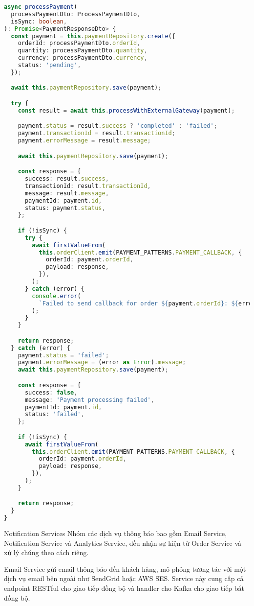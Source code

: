 \begin{lstlisting}[language=Typescript]
async processPayment(
  processPaymentDto: ProcessPaymentDto,
  isSync: boolean,
): Promise<PaymentResponseDto> {
  const payment = this.paymentRepository.create({
    orderId: processPaymentDto.orderId,
    quantity: processPaymentDto.quantity,
    currency: processPaymentDto.currency,
    status: 'pending',
  });

  await this.paymentRepository.save(payment);

  try {
    const result = await this.processWithExternalGateway(payment);

    payment.status = result.success ? 'completed' : 'failed';
    payment.transactionId = result.transactionId;
    payment.errorMessage = result.message;

    await this.paymentRepository.save(payment);

    const response = {
      success: result.success,
      transactionId: result.transactionId,
      message: result.message,
      paymentId: payment.id,
      status: payment.status,
    };

    if (!isSync) {
      try {
        await firstValueFrom(
          this.orderClient.emit(PAYMENT_PATTERNS.PAYMENT_CALLBACK, {
            orderId: payment.orderId,
            payload: response,
          }),
        );
      } catch (error) {
        console.error(
          `Failed to send callback for order ${payment.orderId}: ${error}`,
        );
      }
    }

    return response;
  } catch (error) {
    payment.status = 'failed';
    payment.errorMessage = (error as Error).message;
    await this.paymentRepository.save(payment);

    const response = {
      success: false,
      message: 'Payment processing failed',
      paymentId: payment.id,
      status: 'failed',
    };

    if (!isSync) {
      await firstValueFrom(
        this.orderClient.emit(PAYMENT_PATTERNS.PAYMENT_CALLBACK, {
          orderId: payment.orderId,
          payload: response,
        }),
      );
    }

    return response;
  }
}
\end{lstlisting}

Notification Services
Nhóm các dịch vụ thông báo bao gồm Email Service, Notification Service và Analytics Service, đều nhận sự kiện từ Order Service và xử lý chúng theo cách riêng.

Email Service gửi email thông báo đến khách hàng, mô phỏng tương tác với một dịch vụ email bên ngoài như SendGrid hoặc AWS SES. Service này cung cấp cả endpoint RESTful cho giao tiếp đồng bộ và handler cho Kafka cho giao tiếp bất đồng bộ.

